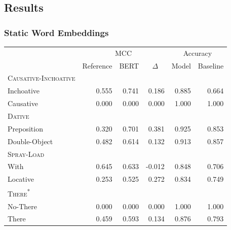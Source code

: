 \documentclass[11pt]{article}
\begin{document}
\subsection{Results}

\subsubsection{Static Word Embeddings}
\begin{table}[!h]
\begin{tabular}{lrrrrr}
\toprule
{} & \multicolumn{3}{c}{MCC} & \multicolumn{2}{c}{Accuracy} \\ \cmidrule(r){2-4} \cmidrule(r){5-6}
{} &   \multicolumn{1}{c}{Reference} &  \multicolumn{1}{c}{BERT} & \multicolumn{1}{c}{$\Delta$} & 
 \multicolumn{1}{c}{Model} &   \multicolumn{1}{c}{Baseline}  \\
\midrule
\textsc{Causative-Inchoative} & & & & & \\
\hspace{1em} Inchoative   &    0.555 & 0.741 &      0.186 &     0.885 &  0.664 \\
\hspace{1em} Causative    &    0.000 & 0.000 &      0.000 &     1.000 &  1.000 \\
\textsc{Dative}&          &           &            &           &        \\
\hspace{1em} Preposition       &    0.320 & 0.701 &      0.381 &     0.925 &  0.853 \\
\hspace{1em} Double-Object     &    0.482 & 0.614 &      0.132 &     0.913 &  0.857 \\
\textsc{Spray-Load}&         &       &            &           &        \\
\hspace{1em} With              &    0.645 & 0.633 &     -0.012 &     0.848 &  0.706 \\
\hspace{1em} Locative          &    0.253 & 0.525 &      0.272 &     0.834 &  0.749 \\
\textsc{There\textsuperscript{*}}&         &       &            &           &        \\
\hspace{1em} No-There          &    0.000 & 0.000 &      0.000 &     1.000 &  1.000 \\
\hspace{1em} There             &    0.459 & 0.593 &      0.134 &     0.876 &  0.793 \\

\end{tabular}
\end{table}
\end{document}
